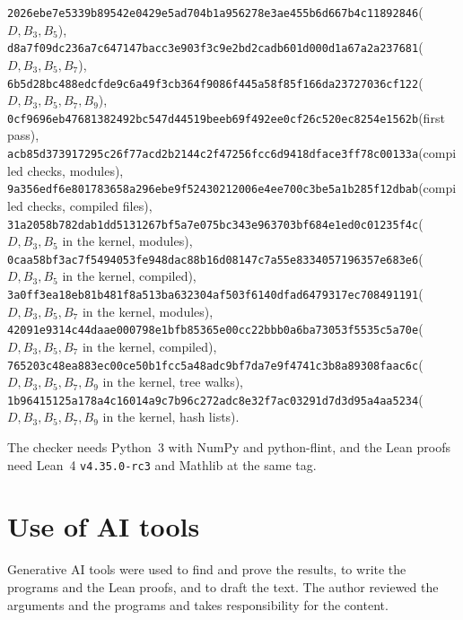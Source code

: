 \documentclass[11pt]{amsart}
\theoremstyle{definition}
\theoremstyle{remark}
\numberwithin{equation}{section}
\newcommand{\ShaThree}{2026ebe7e5339b89542e0429e5ad704b1a956278e3ae455b6d667b4c11892846}
\newcommand{\ShaFour}{d8a7f09dc236a7c647147bacc3e903f3c9e2bd2cadb601d000d1a67a2a237681}
\newcommand{\ShaFive}{6b5d28bc488edcfde9c6a49f3cb364f9086f445a58f85f166da23727036cf122}
\newcommand{\ShaPassOne}{0cf9696eb47681382492bc547d44519beeb69f492ee0cf26c520ec8254e1562b}
\newcommand{\ShaLeanSrc}{acb85d373917295c26f77acd2b2144c2f47256fcc6d9418dface3ff78c00133a}
\newcommand{\ShaLeanOlean}{9a356edf6e801783658a296ebe9f52430212006e4ee700c3be5a1b285f12dbab}
\newcommand{\ShaKSrc}{31a2058b782dab1dd5131267bf5a7e075bc343e963703bf684e1ed0c01235f4c}
\newcommand{\ShaKOlean}{0caa58bf3ac7f5494053fe948dac88b16d08147c7a55e8334057196357e683e6}
\newcommand{\ShaKESrc}{3a0ff3ea18eb81b481f8a513ba632304af503f6140dfad6479317ec708491191}
\newcommand{\ShaKEOlean}{42091e9314c44daae000798e1bfb85365e00cc22bbb0a6ba73053f5535c5a70e}
\newcommand{\ShaKElGlue}{765203c48ea883ec00ce50b1fcc5a48adc9bf7da7e9f4741c3b8a89308faac6c}
\newcommand{\ShaKElSums}{1b96415125a178a4c16014a9c7b96c272adc8e32f7ac03291d7d3d95a4aa5234}
\begin{document}
\begin{center}\scriptsize
\texttt{\ShaThree}\quad($D,B_3,B_5$),\\
\texttt{\ShaFour}\quad($D,B_3,B_5,B_7$),\\
\texttt{\ShaFive}\quad($D,B_3,B_5,B_7,B_9$),\\
\texttt{\ShaPassOne}\quad(first pass),\\
\texttt{\ShaLeanSrc}\quad(compiled checks, modules),\\
\texttt{\ShaLeanOlean}\quad(compiled checks, compiled files),\\
\texttt{\ShaKSrc}\quad($D,B_3,B_5$ in the kernel, modules),\\
\texttt{\ShaKOlean}\quad($D,B_3,B_5$ in the kernel, compiled),\\
\texttt{\ShaKESrc}\quad($D,B_3,B_5,B_7$ in the kernel, modules),\\
\texttt{\ShaKEOlean}\quad($D,B_3,B_5,B_7$ in the kernel, compiled),\\
\texttt{\ShaKElGlue}\quad($D,B_3,B_5,B_7,B_9$ in the kernel, tree walks),\\
\texttt{\ShaKElSums}\quad($D,B_3,B_5,B_7,B_9$ in the kernel, hash lists).
\end{center} The checker needs Python~3 with NumPy and python-flint, and the Lean proofs need Lean~4 \texttt{v4.35.0-rc3} and Mathlib at the same tag.

\section*{Use of AI tools}
Generative AI tools were used to find and prove the results, to write the programs and the Lean proofs, and to draft the text. The author reviewed the arguments and the programs and takes responsibility for the content.
\end{document}
